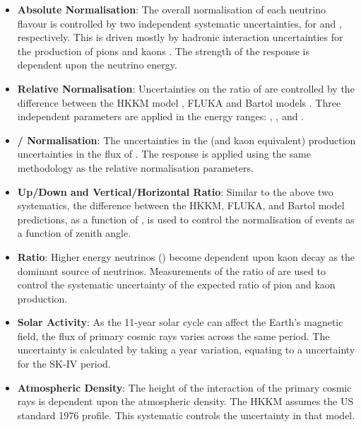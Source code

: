 \begin{itemize}
\item \textbf{Absolute Normalisation}: The overall normalisation of each neutrino flavour is controlled by two independent systematic uncertainties, for  and , respectively. This is driven mostly by hadronic interaction uncertainties for the production of pions and kaons \cite{Honda_2007}. The strength of the response is dependent upon the neutrino energy.
\item \textbf{Relative Normalisation}: Uncertainties on the ratio of  are controlled by the difference between the HKKM model \cite{Honda_2007}, FLUKA \cite{etde_20239111} and Bartol models \cite{Barr_2004}. Three independent parameters are applied in the energy ranges: , , and .
\item \textbf{\quickmath{\nu}/\quickmath{\bar{\nu}} Normalisation}: The uncertainties in the \quickmath{\pi^{+}/\pi^{-}} (and kaon equivalent) production uncertainties in the flux of \quickmath{\nu/\bar{\nu}}. The response is applied using the same methodology as the relative normalisation parameters.
\item \textbf{Up/Down and Vertical/Horizontal Ratio}: Similar to the above two systematics, the difference between the HKKM, FLUKA, and Bartol model predictions, as a function of , is used to control the normalisation of events as a function of zenith angle.
\item{\textbf{ Ratio}}: Higher energy neutrinos () become dependent upon kaon decay as the dominant source of neutrinos. Measurements of the ratio of  \cite{Ambrosini1998-er} are used to control the systematic uncertainty of the expected ratio of pion and kaon production.
\item \textbf{Solar Activity}: As the 11-year solar cycle can affect the Earth's magnetic field, the flux of primary cosmic rays varies across the same period. The uncertainty is calculated by taking a  year variation, equating to a  uncertainty for the SK-IV period.
\item \textbf{Atmospheric Density}: The height of the interaction of the primary cosmic rays is dependent upon the atmospheric density. The HKKM assumes the US standard 1976 \cite{USStandardAtm} profile. This systematic controls the uncertainty in that model.
\end{itemize}

